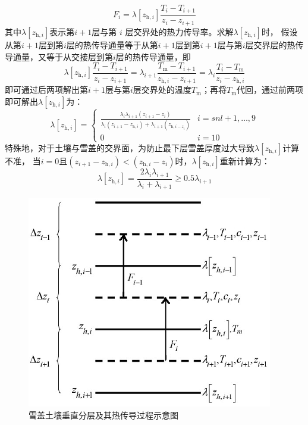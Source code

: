 \begin{equation}
  F_{i}=\lambda\left[z_{\mathrm{h},i}\right] \frac{T_{i}-T_{i+1}}{z_{i}-z_{i+1}}
\end{equation}
其中$\lambda\left[z_{\mathrm{h},i}\right]$表示第$i+1$层与第 $i$ 层交界处的热力传导率。求解$\lambda\left[z_{\mathrm{h},i}\right]$时，
假设从第$i+1$层到第$i$层的热传导通量等于从第$i+1$层到第$i+1$层与第$i$层交界层的热传导通量，又等于从交接层到第$i$层的热传导通量，即
\begin{equation}
  \lambda\left[z_{\mathrm{h},i}\right] \frac{T_{i}-T_{i+1}}{z_{i}-z_{i+1}}=\lambda_{i+1} \frac{T_{\mathrm{m}}-T_{i+1}}{z_{\mathrm{h},i}-z_{i+1}}=\lambda_{i} \frac{T_{i}-T_{\mathrm{m}}}{z_{i}-z_{\mathrm{h},i}}
\end{equation}
即可通过后两项解出第$i+1$层与第$i$层交界处的温度$T_{\mathrm {m}} $；再将$T_{\mathrm {m}} $代回，通过前两项即可解出$\lambda\left[z_{\mathrm{h},i}\right]$为：
\begin{equation}
  \lambda\left[z_{\mathrm{h},i}\right]=\begin{cases}
    \frac{\lambda_{i} \lambda_{i+1}\left(z_{i+1}-z_{i}\right)}{\lambda_{i}\left(z_{i+1} - z_{\mathrm{h},i}\right)+\lambda_{i+1}\left(z_{\mathrm{h},i - z_{i}}\right)} & i=snl+1, \ldots, 9 \\
    0 & i=10
  \end{cases}
\end{equation}
特殊地，对于土壤与雪盖的交界面，为防止最下层雪盖厚度过大导致$\lambda\left[z_{\mathrm{h},i}\right]$计算不准，
当$i=0$且$\left(z_{i+1}-z_{\mathrm{h},i}\right)<\left(z_{\mathrm{h},i}-z_i\right)$时，$\lambda\left[z_{\mathrm{h},i}\right]$重新计算为：
\begin{equation}
  \lambda\left[z_{\mathrm{h},i}\right]=\frac{2 \lambda_{i} \lambda_{i+1}}{\lambda_{i}+\lambda_{i+1}} \geqslant 0.5 \lambda_{i+1}
\end{equation}
{
  \begin{figure}[htbp]
    \centering
    \includegraphics{Figures/雪盖土壤热力过程/雪盖土壤垂直分层及其热传导过程示意图.png}
    \caption{雪盖土壤垂直分层及其热传导过程示意图}
    \label{fig:雪盖土壤垂直分层及其热传导过程示意图}
  \end{figure}
}


